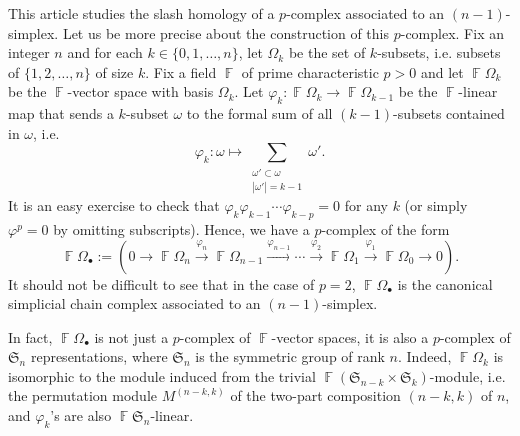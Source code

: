 \documentclass[a4paper]{amsart}
\numberwithin{equation}{subsection}
\theoremstyle{definition}
\DeclareMathOperator{\F}{\mathbb{F}}
\numberwithin{equation}{subsection}
\begin{document}
This article studies the slash homology of a $p$-complex associated to an $(n-1)$-simplex.
Let us be more precise about the construction of this $p$-complex.
Fix an integer $n$ and for each $k\in\{0, 1, \ldots, n\}$, let $\Omega_k$ be the set of $k$-subsets, i.e. subsets of $\{1, 2, \ldots, n\}$ of size $k$.
Fix a field $\F$ of prime characteristic $p>0$ and let $\F\Omega_k$ be the $\F$-vector space with basis $\Omega_k$.
Let $\varphi_k:\F\Omega_k\to \F\Omega_{k-1}$ be the $\F$-linear map that sends a $k$-subset $\omega$ to the formal sum of all $(k-1)$-subsets contained in $\omega$, i.e.
\[
\varphi_k:\omega \mapsto \sum_{\substack{\omega' \subset \omega \\ |\omega'|=k-1}} \omega'.
\]
It is an easy exercise to check that $\varphi_k\varphi_{k-1}\cdots \varphi_{k-p}=0$ for any $k$ (or simply $\varphi^p=0$ by omitting subscripts).
Hence, we have a $p$-complex of the form
\[
\F\Omega_\bullet:= ( 0\to \F\Omega_n \xrightarrow{\varphi_n} \F\Omega_{n-1} \xrightarrow{\varphi_{n-1}} \cdots \xrightarrow{\varphi_2}\F\Omega_1 \xrightarrow{\varphi_1}\F\Omega_0 \to 0).
\]
It should not be difficult to see that in the case of $p=2$, $\F\Omega_\bullet$ is the canonical simplicial chain complex associated to an $(n-1)$-simplex.

In fact, $\F\Omega_\bullet$ is not just a $p$-complex of $\F$-vector spaces, it is also a $p$-complex of $\mathfrak{S}_n$ representations, where $\mathfrak{S}_n$ is the symmetric group of rank $n$.
Indeed, $\F\Omega_k$ is isomorphic to the module induced from the trivial $\F(\mathfrak{S}_{n-k}\times \mathfrak{S}_k)$-module, i.e. the permutation module $M^{(n-k,k)}$ of the two-part composition $(n-k,k)$ of $n$, and $\varphi_k$'s are also $\F\mathfrak{S}_n$-linear.
\end{document}
